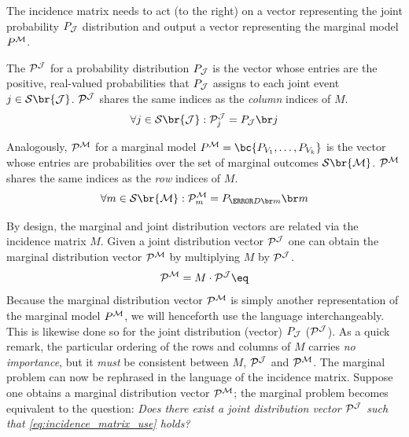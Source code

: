 \documentclass[aps, 10pt, english, twoside, pra, nofootinbib, tightenlines, longbibliography, superscriptaddress]{revtex4-1}
\renewcommand{\Events}[1]{\mathcal{S}\br{#1}} %
\begin{document}
    The incidence matrix needs to act (to the right) on a vector representing the joint probability $\prob[\jointvar]$ distribution and output a vector representing the marginal model $\prob^{\mscenario}$.
    \begin{definition}
        The  $\probvec^{\jointvar}$ for a probability distribution $\prob[\jointvar]$ is the vector whose entries are the positive, real-valued probabilities that $\prob[\jointvar]$ assigns to each joint event $j \in \Events{\jointvar}$. $\probvec^{\jointvar}$ shares the same indices as the \textit{column} indices of $M$.
        \[ \forall j \in \Events{\jointvar} : \probvec^{\jointvar}_j = \prob[\jointvar][j] \]
    \end{definition}
    \begin{definition}
        Analogously,  $\probvec^{\mscenario}$ for a marginal model $\prob^{\mscenario} = \bc{P_{V_1}, \ldots, P_{V_k}}$ is the vector whose entries are probabilities over the set of marginal outcomes $\Events{\mscenario}$. $\probvec^{\mscenario}$ shares the same indices as the \textit{row} indices of $M$.
        \[ \forall m \in \Events{\mscenario} : \probvec^{\mscenario}_m = \prob[\Dom{m}][m] \]
    \end{definition}
    By design, the marginal and joint distribution vectors are related via the incidence matrix $M$. Given a joint distribution vector $\probvec^{\jointvar}$ one can obtain the marginal distribution vector $\probvec^{\mscenario}$ by multiplying $M$ by $\probvec^{\jointvar}$.
    \[ \probvec^{\mscenario} = M \cdot \probvec^{\jointvar} \eq \label{eq:incidence_matrix_use} \]
    Because the marginal distribution vector $\probvec^{\mscenario}$ is simply another representation of the marginal model $\prob^{\mscenario}$, we will henceforth use the language interchangeably. This is likewise done so for the joint distribution (vector) $\prob[\jointvar]$ ($\probvec^{\jointvar}$). As a quick remark, the particular ordering of the rows and columns of $M$ carries \textit{no importance}, but it \textit{must} be consistent between $M$, $\probvec^{\jointvar}$ and $\probvec^{\mscenario}$. The marginal problem can now be rephrased in the language of the incidence matrix. Suppose one obtains a marginal distribution vector $\probvec^{\mscenario}$; the marginal problem becomes equivalent to the question:
    \textit{Does there exist a joint distribution vector $\probvec^{\jointvar}$ such that \cref{eq:incidence_matrix_use} holds?}
\end{document}
